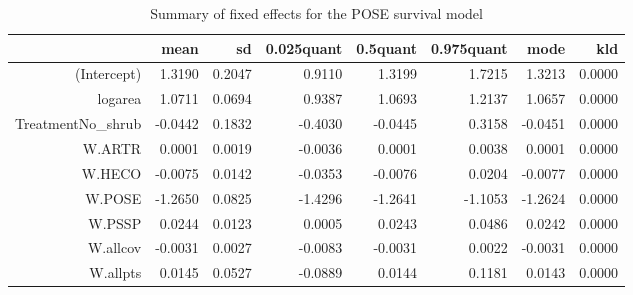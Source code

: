 \begin{table}[ht]
\centering
\caption{Summary of fixed effects for the POSE survival model} 
\label{POSEsurvival}
\begin{tabular}{rrrrrrrr}
  \hline
 & mean & sd & 0.025quant & 0.5quant & 0.975quant & mode & kld \\ 
  \hline
(Intercept) & 1.3190 & 0.2047 & 0.9110 & 1.3199 & 1.7215 & 1.3213 & 0.0000 \\ 
  logarea & 1.0711 & 0.0694 & 0.9387 & 1.0693 & 1.2137 & 1.0657 & 0.0000 \\ 
  TreatmentNo\_shrub & -0.0442 & 0.1832 & -0.4030 & -0.0445 & 0.3158 & -0.0451 & 0.0000 \\ 
  W.ARTR & 0.0001 & 0.0019 & -0.0036 & 0.0001 & 0.0038 & 0.0001 & 0.0000 \\ 
  W.HECO & -0.0075 & 0.0142 & -0.0353 & -0.0076 & 0.0204 & -0.0077 & 0.0000 \\ 
  W.POSE & -1.2650 & 0.0825 & -1.4296 & -1.2641 & -1.1053 & -1.2624 & 0.0000 \\ 
  W.PSSP & 0.0244 & 0.0123 & 0.0005 & 0.0243 & 0.0486 & 0.0242 & 0.0000 \\ 
  W.allcov & -0.0031 & 0.0027 & -0.0083 & -0.0031 & 0.0022 & -0.0031 & 0.0000 \\ 
  W.allpts & 0.0145 & 0.0527 & -0.0889 & 0.0144 & 0.1181 & 0.0143 & 0.0000 \\ 
   \hline
\end{tabular}
\end{table}

